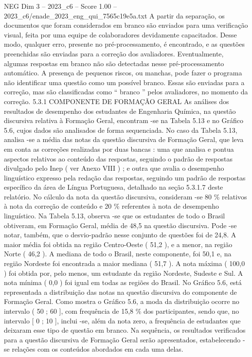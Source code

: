\begin{textsample}{NEG Dim 3 – 2023\_c6 – Score 1.00 – 2023\_c6/enade\_2023\_eng\_qui\_7565c19e5a.txt}
A partir da separação, os documentos que foram considerados em branco são enviados para uma verificação visual, feita por uma equipe de colaboradores devidamente capacitados.
Desse modo, qualquer erro, presente no pré-processamento, é encontrado, e as questões preenchidas são enviadas para a correção dos avaliadores.
Eventualmente, algumas respostas em branco não são detectadas nesse pré-processamento automático.
A presença de pequenos riscos, ou manchas, pode fazer o programa não identificar uma questão como um possível branco.
Essas são enviadas para a correção, mas são classificadas como “ branco ” pelos avaliadores, no momento da correção. 5.3.1 COMPONENTE DE FORMAÇÃO GERAL As análises dos resultados de desempenho dos estudantes de Engenharia Química, na questão discursiva relativa à Formação Geral, encontram -se na Tabela 5.13 e no Gráfico 5.6, cujos dados são analisados de forma sequenciada.
No caso da Tabela 5.13, analisa -se a média das notas da questão discursiva de Formação Geral, que leva em conta as correções realizadas por duas bancas : uma que analisa e pontua aspectos relativos ao conteúdo das respostas, seguindo o padrão de respostas divulgado pelo Inep ( ver Anexo VIII ) ; e outra que avalia o desempenho linguístico expresso pela redação das respostas, seguindo um padrão de respostas específico da área de Língua Portuguesa, detalhado na seção 5.3.1.7 deste relatório.
No cálculo da nota da questão discursiva, consideram -se 80 \% relativos à nota da correção de conteúdo e 20 \% referentes à nota de desempenho linguístico.
Na Tabela 5.13, observa -se que os estudantes de todo o Brasil obtiveram, em Formação Geral, média de 48,5 na questão discursiva.
Pode -se notar, também, que o desvio-padrão nesse conjunto de questões foi de 24,8.
A maior média foi obtida na região Centro-Oeste ( 51,2 ), e a menor, na região Norte ( 46,2 ).
A mediana de todo o Brasil, neste componente, foi 50,1 e, na região Nordeste foi encontrada a maior mediana ( 51,7 ).
A nota máxima ( 100,0 ) foi obtida por, pelo menos, um estudante da região Nordeste, Sudeste e Sul.
A nota mínima ( 0,0 ) foi igual em todas as regiões do Brasil.
No Gráfico 5.6, está representada a distribuição das notas na questão discursiva do componente de Formação Geral.
Como mostra o Gráfico 5.6, a moda da distribuição ocorre no intervalo ( 50 ; 60 ], com frequência de 15,8 \% dos participantes, sendo que, no intervalo [ 0 ; 10 ], inclui -se, além da nota zero, a frequência de estudantes que deixaram esse tipo de questão em branco.
Na sequência, os resultados verificados para a questão discursiva de Formação Geral serão apresentados, estabelecendo -se relações com os conteúdos abordados em cada uma delas.

\end{textsample}
